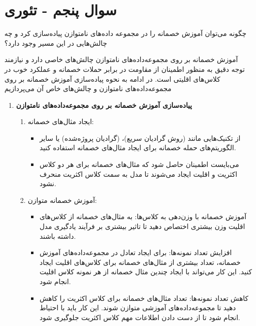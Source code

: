 \section{سوال پنجم - تئوری}
چگونه می‌توان آموزش خصمانه را در مجموعه داده‌های نامتوازن پیاده‌سازی کرد و چه چالش‌هایی در این مسیر وجود دارد؟





\begin{qsolve}
آموزش خصمانه بر روی مجموعه‌داده‌های نامتوازن چالش‌های خاصی دارد و نیازمند توجه دقیق به منظور اطمینان از مقاومت در برابر حملات خصمانه و عملکرد خوب در کلاس‌های اقلیتی است. در ادامه به نحوه پیاده‌سازی آموزش خصمانه بر روی مجموعه‌داده‌های نامتوازن و چالش‌های خاص آن می‌پردازیم


\begin{enumerate}
	\item \textbf{پیاده‌سازی آموزش خصمانه بر روی مجموعه‌داده‌های نامتوازن}
	\begin{enumerate}
		\item ایجاد مثال‌های خصمانه:
		\begin{itemize}
			\item 
از تکنیک‌هایی مانند  (روش گرادیان سریع)،  (گرادیان پروژه‌شده) یا سایر الگوریتم‌های حمله خصمانه برای ایجاد مثال‌های خصمانه استفاده کنید.

			\item 
می‌بایست اطمینان حاصل شود که مثال‌های خصمانه برای هر دو کلاس اکثریت و اقلیت ایجاد می‌شوند تا مدل به سمت کلاس اکثریت منحرف نشود.
		\end{itemize}
		
		
		\item آموزش خصمانه متوازن:
		\begin{itemize}
			\item 
آموزش خصمانه با وزن‌دهی به کلاس‌ها: به مثال‌های خصمانه از کلاس‌های اقلیت وزن بیشتری اختصاص دهید تا تاثیر بیشتری بر فرآیند یادگیری مدل داشته باشند.


			\item 
افزایش تعداد نمونه‌ها: برای ایجاد تعادل در مجموعه‌داده‌های آموزش خصمانه، تعداد بیشتری از مثال‌های خصمانه برای کلاس‌های اقلیت ایجاد کنید. این کار می‌تواند با ایجاد چندین مثال خصمانه از هر نمونه کلاس اقلیت انجام شود.

	
			\item 
کاهش تعداد نمونه‌ها: تعداد مثال‌های خصمانه برای کلاس اکثریت را کاهش دهید تا مجموعه‌داده‌های آموزشی متوازن شوند. این کار باید با احتیاط انجام شود تا از دست دادن اطلاعات مهم کلاس اکثریت جلوگیری شود.
		\end{itemize}
		

\end{enumerate}
\end{enumerate}
\end{qsolve}
